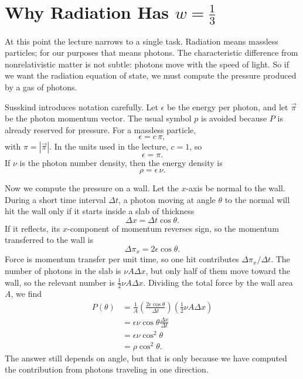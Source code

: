 \section{Why Radiation Has \(w=\frac13\)}

At this point the lecture narrows to a single task. Radiation means massless particles; for our purposes that means photons. The characteristic difference from nonrelativistic matter is not subtle: photons move with the speed of light. So if we want the radiation equation of state, we must compute the pressure produced by a gas of photons.

Susskind introduces notation carefully. Let \(\epsilon\) be the energy per photon, and let \(\vec{\pi}\) be the photon momentum vector. The usual symbol \(p\) is avoided because \(P\) is already reserved for pressure. For a massless particle,
\begin{equation}
\epsilon=c\,\pi,
\end{equation}
with \(\pi=|\vec{\pi}|\). In the units used in the lecture, \(c=1\), so
\begin{equation}
\epsilon=\pi.
\end{equation}
If \(\nu\) is the photon number density, then the energy density is
\begin{equation}
\rho=\epsilon\,\nu.
\end{equation}

Now we compute the pressure on a wall. Let the \(x\)-axis be normal to the wall. During a short time interval \(\Delta t\), a photon moving at angle \(\theta\) to the normal will hit the wall only if it starts inside a slab of thickness
\begin{equation}
\Delta x=\Delta t\cos\theta.
\end{equation}
If it reflects, its \(x\)-component of momentum reverses sign, so the momentum transferred to the wall is
\begin{equation}
\Delta \pi_x=2\epsilon\cos\theta.
\end{equation}
Force is momentum transfer per unit time, so one hit contributes \(\Delta \pi_x/\Delta t\). The number of photons in the slab is \(\nu A\Delta x\), but only half of them move toward the wall, so the relevant number is \(\tfrac12 \nu A\Delta x\). Dividing the total force by the wall area \(A\), we find
\begin{align}
P(\theta)
&=
\frac{1}{A}
\left(\frac{2\epsilon\cos\theta}{\Delta t}\right)
\left(\frac12 \nu A\Delta x\right) \\
&=
\epsilon\nu\cos\theta\frac{\Delta x}{\Delta t} \\
&=
\epsilon\nu\cos^2\theta \\
&=
\rho\cos^2\theta.
\end{align}
The answer still depends on angle, but that is only because we have computed the contribution from photons traveling in one direction.

